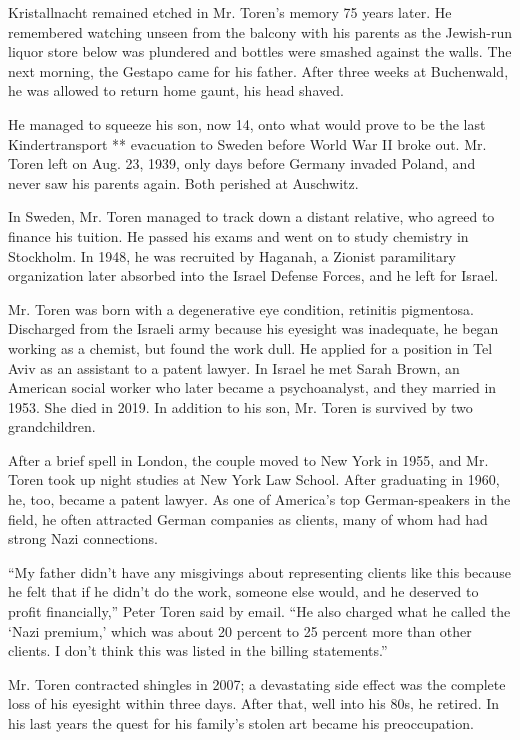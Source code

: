 Kristallnacht remained etched in Mr. Toren's memory 75 years later. He
remembered watching unseen from the balcony with his parents as the
Jewish-run liquor store below was plundered and bottles were smashed
against the walls. The next morning, the Gestapo came for his father.
After three weeks at Buchenwald, he was allowed to return home gaunt,
his head shaved.

He managed to squeeze his son, now 14, onto what would prove to be the
last Kindertransport ** evacuation to Sweden before World War II broke
out. Mr. Toren left on Aug. 23, 1939, only days before Germany invaded
Poland, and never saw his parents again. Both perished at Auschwitz.

In Sweden, Mr. Toren managed to track down a distant relative, who
agreed to finance his tuition. He passed his exams and went on to study
chemistry in Stockholm. In 1948, he was recruited by Haganah, a Zionist
paramilitary organization later absorbed into the Israel Defense Forces,
and he left for Israel.

Mr. Toren was born with a degenerative eye condition, retinitis
pigmentosa. Discharged from the Israeli army because his eyesight was
inadequate, he began working as a chemist, but found the work dull. He
applied for a position in Tel Aviv as an assistant to a patent lawyer.
In Israel he met Sarah Brown, an American social worker who later became
a psychoanalyst, and they married in 1953. She died in 2019. In addition
to his son, Mr. Toren is survived by two grandchildren.

After a brief spell in London, the couple moved to New York in 1955, and
Mr. Toren took up night studies at New York Law School. After graduating
in 1960, he, too, became a patent lawyer. As one of America's top
German-speakers in the field, he often attracted German companies as
clients, many of whom had had strong Nazi connections.

``My father didn't have any misgivings about representing clients like
this because he felt that if he didn't do the work, someone else would,
and he deserved to profit financially,'' Peter Toren said by email. ``He
also charged what he called the `Nazi premium,' which was about 20
percent to 25 percent more than other clients. I don't think this was
listed in the billing statements.''

Mr. Toren contracted shingles in 2007; a devastating side effect was the
complete loss of his eyesight within three days. After that, well into
his 80s, he retired. In his last years the quest for his family's stolen
art became his preoccupation.

